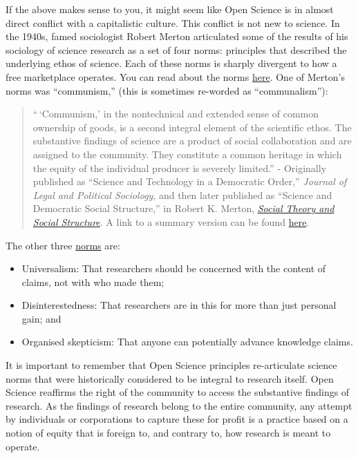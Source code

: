 \documentclass[]{book}
\providecommand{\tightlist}{%
  \setlength{\itemsep}{0pt}\setlength{\parskip}{0pt}}
\begin{document}
{{If the above makes sense to you, it might seem like Open Science is in almost direct conflict with a capitalistic culture. This conflict is not new to science. In the 1940s, famed sociologist Robert Merton articulated some of the results of his sociology of science research as a set of four norms: principles that described the underlying ethos of science. Each of these norms is sharply divergent to how a free marketplace operates. You can read about the norms \href{https://en.wikipedia.org/wiki/Mertonian_norms}{here}. One of Merton's norms was ``communism,'' (this is sometimes re-worded as ``communalism''):

\begin{quote}
``\,`Communism,' in the nontechnical and extended sense of common ownership of goods, is a second integral element of the scientific ethos. The substantive findings of science are a product of social collaboration and are assigned to the community. They constitute a common heritage in which the equity of the individual producer is severely limited.'' - Originally published as ``Science and Technology in a Democratic Order,'' \emph{Journal of Legal and Political Sociology}, and then later published as ``Science and Democratic Social Structure,'' in Robert K. Merton, \href{https://en.wikipedia.org/wiki/Social_Theory_and_Social_Structure}{\emph{Social Theory and Social Structure}}. A link to a summary version can be found \href{https://www.collier.sts.vt.edu/5424/pdfs/merton_1973.pdf}{here}.
\end{quote}

The other three \href{https://scienceblogs.com/ethicsandscience/2008/01/29/basic-concepts-the-norms-of-sc}{norms} are:

\begin{itemize}
\tightlist
\item
  Universalism: That researchers should be concerned with the content of claims, not with who made them;
\item
  Disinterestedness: That researchers are in this for more than just personal gain; and
\item
  Organised skepticism: That anyone can potentially advance knowledge claims.
\end{itemize}

It is important to remember that Open Science principles re-articulate science norms that were historically considered to be integral to research itself. Open Science reaffirms the right of the community to access the substantive findings of research. As the findings of research belong to the entire community, any attempt by individuals or corporations to capture these for profit is a practice based on a notion of equity that is foreign to, and contrary to, how research is meant to operate.

}}
\end{document}
